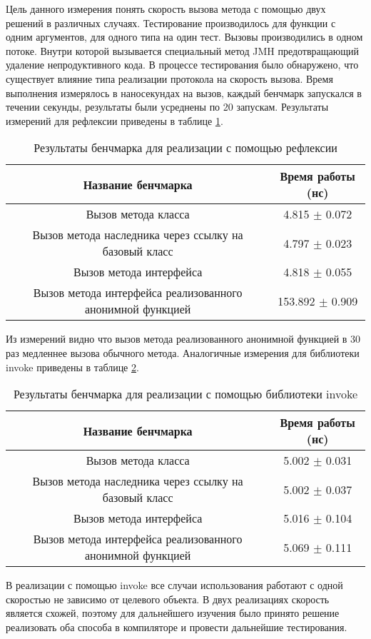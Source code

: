 Цель данного измерения понять скорость вызова метода с помощью двух решений в различных случаях. Тестирование производилось для функции с одним аргументов, для одного типа на один тест. Вызовы производились в одном потоке. Внутри которой вызывается специальный метод JMH предотвращающий удаление непродуктивного кода. В процессе тестирования было обнаружено, что существует влияние типа реализации протокола на скорость вызова. Время выполнения измерялось в наносекундах на вызов, каждый бенчмарк запускался в течении секунды, результаты были усреднены по 20 запускам. Результаты измерений для рефлексии приведены в таблице \ref{benchmark:prototype:reflection}.
\begin{table}[h]
\begin{center}
\begin{tabular}{|c|c|} \hline
Название бенчмарка & Время работы (нс) \\ \hline
Вызов метода класса & 4.815 $\pm$ 0.072 \\ \hline
Вызов метода наследника через ссылку на базовый класс & 4.797 $\pm$ 0.023 \\ \hline
Вызов метода интерфейса & 4.818 $\pm$ 0.055 \\ \hline
Вызов метода интерфейса реализованного анонимной функцией & 153.892 $\pm$ 0.909 \\ \hline
\end{tabular}
\caption{Результаты бенчмарка для реализации с помощью рефлексии}
\label{benchmark:prototype:reflection}
\end{center}
\end{table}

Из измерений видно что вызов метода реализованного анонимной функцией в 30 раз медленнее вызова обычного метода. Аналогичные измерения для библиотеки invoke приведены в таблице \ref{benchmark:prototype:invoke}.

\begin{table}[h]
\begin{center}
\begin{tabular}{|c|c|} \hline
Название бенчмарка & Время работы (нс) \\ \hline
Вызов метода класса & 5.002 $\pm$ 0.031 \\ \hline
Вызов метода наследника через ссылку на базовый класс & 5.002 $\pm$ 0.037 \\ \hline
Вызов метода интерфейса & 5.016 $\pm$ 0.104 \\ \hline
Вызов метода интерфейса реализованного анонимной функцией & 5.069 $\pm$ 0.111 \\ \hline
\end{tabular}
\caption{Результаты бенчмарка для реализации с помощью библиотеки invoke}
\label{benchmark:prototype:invoke}
\end{center}
\end{table}

В реализации с помощью invoke все случаи использования работают с одной скоростью не зависимо от целевого объекта. В двух реализациях скорость является схожей, поэтому для дальнейшего изучения было принято решение реализовать оба способа в компиляторе и провести дальнейшие тестирования.